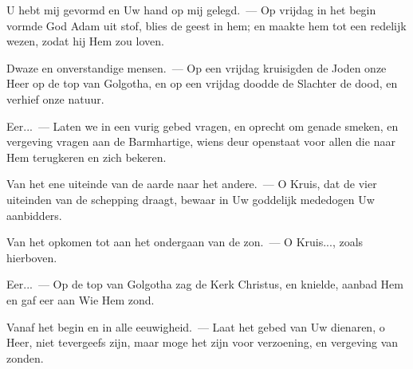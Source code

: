 \documentclass[12pt,twoside,a5paper]{article}
\begin{document}

\begin{halfparskip}
  U hebt mij gevormd en Uw hand op mij gelegd.~--- Op vrijdag in het begin vormde God Adam uit stof, blies de geest in hem; en maakte hem tot een redelijk wezen, zodat hij Hem zou loven.

  Dwaze en onverstandige mensen.~--- Op een vrijdag kruisigden de Joden onze Heer op de top van Golgotha, en op een vrijdag doodde de Slachter de dood, en verhief onze natuur.

  Eer...~--- Laten we in een vurig gebed vragen, en oprecht om genade smeken, en vergeving vragen aan de Barmhartige, wiens deur openstaat voor allen die naar Hem terugkeren en zich bekeren.
\end{halfparskip}


\begin{halfparskip}
  Van het ene uiteinde van de aarde naar het andere.~--- O Kruis, dat de vier uiteinden van de schepping draagt, bewaar in Uw goddelijk mededogen Uw aanbidders.

  Van het opkomen tot aan het ondergaan van de zon.~--- O Kruis..., zoals hierboven.

  Eer...~--- Op de top van Golgotha zag de Kerk Christus, en knielde, aanbad Hem en gaf eer aan Wie Hem zond.

  Vanaf het begin en in alle eeuwigheid.~--- Laat het gebed van Uw dienaren, o Heer, niet tevergeefs zijn, maar moge het zijn voor verzoening, en vergeving van zonden.
\end{halfparskip}

\end{document}
